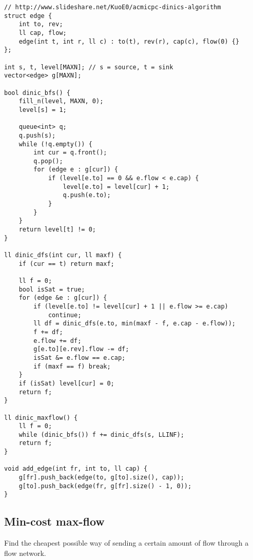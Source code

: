 \documentclass{article}
\begin{document}
\begin{lstlisting}
// http://www.slideshare.net/KuoE0/acmicpc-dinics-algorithm
struct edge {
	int to, rev;
	ll cap, flow;
	edge(int t, int r, ll c) : to(t), rev(r), cap(c), flow(0) {}
};

int s, t, level[MAXN]; // s = source, t = sink
vector<edge> g[MAXN];

bool dinic_bfs() {
	fill_n(level, MAXN, 0);
	level[s] = 1;

	queue<int> q;
	q.push(s);
	while (!q.empty()) {
		int cur = q.front();
		q.pop();
		for (edge e : g[cur]) {
			if (level[e.to] == 0 && e.flow < e.cap) {
				level[e.to] = level[cur] + 1;
				q.push(e.to);
			}
		}
	}
	return level[t] != 0;
}

ll dinic_dfs(int cur, ll maxf) {
	if (cur == t) return maxf;

	ll f = 0;
	bool isSat = true;
	for (edge &e : g[cur]) {
		if (level[e.to] != level[cur] + 1 || e.flow >= e.cap)
			continue;
		ll df = dinic_dfs(e.to, min(maxf - f, e.cap - e.flow));
		f += df;
		e.flow += df;
		g[e.to][e.rev].flow -= df;
		isSat &= e.flow == e.cap;
		if (maxf == f) break;
	}
	if (isSat) level[cur] = 0;
	return f;
}

ll dinic_maxflow() {
	ll f = 0;
	while (dinic_bfs()) f += dinic_dfs(s, LLINF);
	return f;
}

void add_edge(int fr, int to, ll cap) {
	g[fr].push_back(edge(to, g[to].size(), cap));
	g[to].push_back(edge(fr, g[fr].size() - 1, 0));
}
\end{lstlisting}

\subsection{Min-cost max-flow}

Find the cheapest possible way of sending a certain amount of flow through a flow network.
\end{document}
